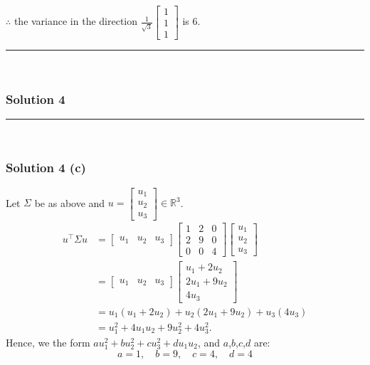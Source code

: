 \documentclass{article}
\begin{document}
\subsubsection*{\normalfont}{$\therefore$ the variance in the direction $\frac{1}{\sqrt{3}}\begin{bmatrix}1 \\ 1 \\ 1\end{bmatrix}$ is $6$.} \\

\noindent\rule{\textwidth}{0.4pt}\\

\newpage

\subsubsection*{Solution 4}
\noindent\rule{\textwidth}{0.4pt}\\
\subsubsection*{Solution 4 (c)}
Let $\Sigma$ be as above and $u=\begin{bmatrix}u_1 \\ u_2 \\ u_3\end{bmatrix}\in\mathbb{R}^3$.
\begin{align*}
u^\top \Sigma u
&= \begin{bmatrix}u_1 & u_2 & u_3\end{bmatrix}
\begin{bmatrix}
1 & 2 & 0 \\
2 & 9 & 0 \\
0 & 0 & 4
\end{bmatrix}
\begin{bmatrix}u_1 \\ u_2 \\ u_3\end{bmatrix} \\
&= \begin{bmatrix}u_1 & u_2 & u_3\end{bmatrix}
\begin{bmatrix}u_1 + 2u_2 \\ 2u_1 + 9u_2 \\ 4u_3\end{bmatrix} \\
&= u_1(u_1 + 2u_2) + u_2(2u_1 + 9u_2) + u_3(4u_3) \\
&= u_1^2 + 4u_1u_2 + 9u_2^2 + 4u_3^2.
\end{align*}
Hence, we the form $a u_1^2 + b u_2^2 + c u_3^2 + d u_1 u_2$, and $a$,$b$,$c$,$d$ are:
\[
a = 1,\quad b = 9,\quad c = 4,\quad d = 4
\]
\end{document}
